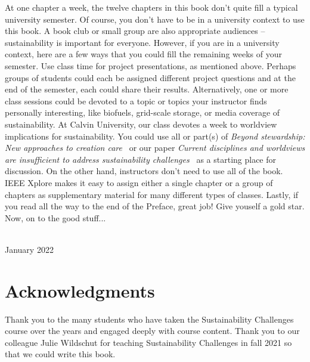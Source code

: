 {At one chapter a week, the twelve chapters in this book don't quite fill a typical 
university semester. 
Of course, you don't have to be in a university context to use this book. 
A book club or small group are also appropriate audiences -- sustainability 
is important for everyone. 
However, if you are in a university context, here are a few ways that you could fill the 
remaining weeks of your semester. 
Use class time for project presentations, as mentioned above. 
Perhaps groups of students could each be assigned different project questions and 
at the end of the semester, each could share their results.
Alternatively, one or more class sessions could be devoted to a topic or topics 
your instructor finds personally interesting, like biofuels, grid-scale storage, 
or media coverage of sustainability. 
At Calvin University, our class devotes a week to worldview implications for 
sustainability. 
You could use all or part(s) of \emph{Beyond stewardship: New approaches to 
creation care}~\citep{Warners:2019aa}
or our paper \emph{Current disciplines and worldviews are insufficient
to address sustainability challenges}~\cite{VanH2019} as a starting place for discussion. 
On the other hand, instructors don't need to use all of the book. 
IEEE Xplore makes it easy to assign either a single chapter or a group of chapters 
as supplementary material for many different types of classes.
Lastly, if you read all the way to the end of the Preface, great job! 
Give youself a gold star. 
Now, on to the good stuff...

\vspace*{2pc}
\noindent\AUTHORS\\
\noindent January 2022
}

\cleardoublepage




\chapter*{Acknowledgments}

\thispagestyle{plain}

\noindent
Thank you to the many students who have taken the Sustainability Challenges course 
over the years and engaged deeply with course content.
Thank you to our colleague Julie Wildschut for teaching Sustainability Challenges in fall 2021 so
that we could write this book.

